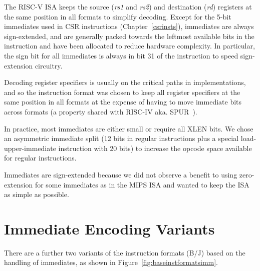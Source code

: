 The RISC-V ISA keeps the source ({\em rs1} and {\em rs2}) and
destination ({\em rd}) registers at the same position in all formats
to simplify decoding.  Except for the 5-bit immediates used in CSR
instructions (Chapter~\ref{csrinsts}), immediates are always
sign-extended, and are generally packed towards the leftmost available
bits in the instruction and have been allocated to reduce hardware
complexity.  In particular, the sign bit for all immediates is always
in bit 31 of the instruction to speed sign-extension circuitry.

\begin{commentary}
Decoding register specifiers is usually on the critical paths in
implementations, and so the instruction format was chosen to keep all
register specifiers at the same position in all formats at the expense
of having to move immediate bits across formats (a property shared
with RISC-IV aka. SPUR~\cite{spur-jsscc1989}).

In practice, most immediates are either small or require all XLEN
bits.  We chose an asymmetric immediate split (12 bits in regular
instructions plus a special load-upper-immediate instruction with 20
bits) to increase the opcode space available for regular instructions.

Immediates are sign-extended because we did not observe a benefit to
using zero-extension for some immediates as in the MIPS ISA and wanted
to keep the ISA as simple as possible.
\end{commentary}

\section{Immediate Encoding Variants}

There are a further two variants of the instruction formats (B/J)
based on the handling of immediates, as shown in
Figure~\ref{fig:baseinstformatsimm}.

